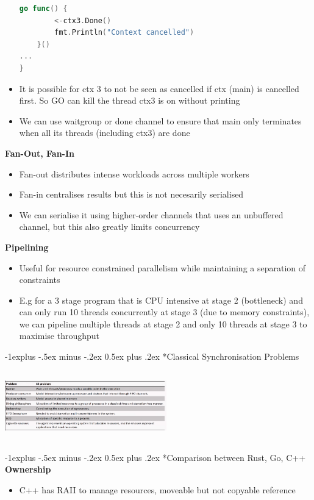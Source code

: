 \documentclass[10pt, landscape]{article}
\makeatletter
\renewcommand{\subsection}{\@startsection{subsection}{2}{0mm}%
                                {-1explus -.5ex minus -.2ex}%
                                {0.5ex plus .2ex}%
                                {\normalfont\normalsize\bfseries}}
\makeatother
\begin{document}
\begin{multicols}{4}
\begin{itemize}
\begin{lstlisting}[language=Go,  breaklines=true, breakatwhitespace=true]
    go func() {
        <-ctx3.Done()
        fmt.Println("Context cancelled")
    }()
...
}
\end{lstlisting}
    \item It is possible for ctx 3 to not be seen as cancelled if ctx (main) is cancelled first. So GO can kill the thread ctx3 is on without printing 
    \item We can use waitgroup or done channel to ensure that main only terminates when all its threads (including ctx3) are done
\end{itemize}

\textbf{Fan-Out, Fan-In} 
\begin{itemize}
    \item Fan-out distributes intense workloads across multiple workers
    \item Fan-in centralises results but this is not necesarily serialised 
    \item We can serialise it using higher-order channels that uses an unbuffered channel, but this also greatly limits concurrency
\end{itemize}

\textbf{Pipelining} \\ 
\begin{itemize}
    \item Useful for resource constrained parallelism while maintaining a separation of constraints
    \item E.g for a 3 stage program that is CPU intensive at stage 2 (bottleneck) and can only run 10 threads concurrently at stage 3 (due to memory constraints), we can pipeline multiple threads at stage 2 and only 10 threads at stage 3 to maximise throughput
\end{itemize}

\pagebreak
\subsection*{Classical Synchronisation Problems}

\includegraphics*[width=7cm, height=3cm]{classicalSummary.png}

\subsection*{Comparison between Rust, Go, C++}
\textbf{Ownership} \\ 
\begin{itemize}
    \item C++ has RAII to manage resources, moveable but not copyable reference
\end{itemize}


\end{multicols}
\end{document}
